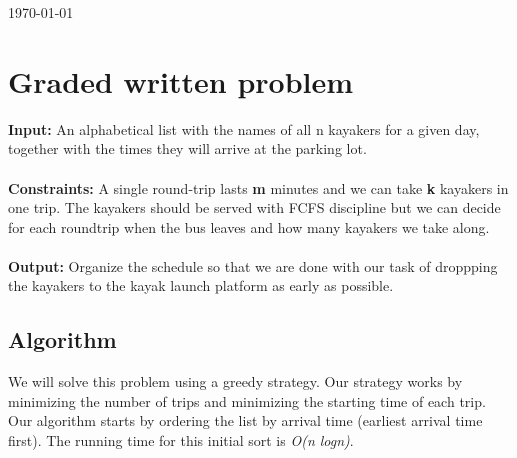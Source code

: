 \documentclass[8pt]{article}
\begin{document}
\hfill \small{\today} \\
\setlength{\fboxrule}{.5mm}\setlength{\fboxsep}{1.2mm}
\newlength{\boxlength}\setlength{\boxlength}{\textwidth}
\addtolength{\boxlength}{-4mm}
\begin{center}\end{center}
\vspace{5mm}

\section{Graded written problem}

\textbf{Input:} An alphabetical list with the names of all n kayakers for a given day, together with the times they will arrive at the parking lot.
\\ \\
\textbf{Constraints:} A single round-trip lasts \textbf{m} minutes and we can take \textbf{k} kayakers in one trip. The kayakers should be served with FCFS discipline but we can decide for each roundtrip when the bus leaves and how many kayakers we take along.
\\ \\
\textbf{Output:} Organize the schedule so that we are done with our task of droppping the kayakers to the kayak launch platform as early as possible.

\subsection{Algorithm}
We will solve this problem using a greedy strategy. Our strategy works by minimizing the number of trips and minimizing the starting time of each trip. Our algorithm starts by ordering the list by arrival time (earliest arrival time first). The running time for this initial sort is \textit{O(n logn)}.
\end{document}

